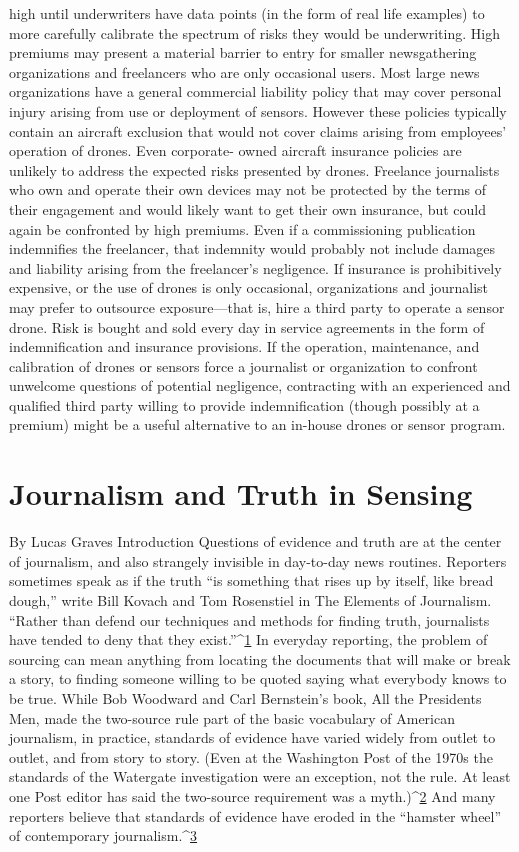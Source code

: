 high until underwriters have data points (in the form of real life examples)
to more carefully calibrate the spectrum of risks they would be underwriting.
High premiums may present a material barrier to entry for smaller
newsgathering organizations and freelancers who are only occasional users.
Most large news organizations have a general commercial liability policy
that may cover personal injury arising from use or deployment of sensors.
However these policies typically contain an aircraft exclusion that would
not cover claims arising from employees' operation of drones. Even corporate-
owned aircraft insurance policies are unlikely to address the expected
risks presented by drones. Freelance journalists who own and operate their
own devices may not be protected by the terms of their engagement and
would likely want to get their own insurance, but could again be confronted
by high premiums. Even if a commissioning publication indemnifies the
freelancer, that indemnity would probably not include damages and liability
arising from the freelancer's negligence.
If insurance is prohibitively expensive, or the use of drones is only occasional,
organizations and journalist may prefer to outsource exposure—that
is, hire a third party to operate a sensor drone. Risk is bought and sold every
day in service agreements in the form of indemnification and insurance
provisions. If the operation, maintenance, and calibration of drones or sensors
force a journalist or organization to confront unwelcome questions of
potential negligence, contracting with an experienced and qualified third
party willing to provide indemnification (though possibly at a premium)
might be a useful alternative to an in-house drones or sensor program.

\section{Journalism and Truth in Sensing}
By Lucas Graves
Introduction
Questions of evidence and truth are at the center of journalism, and also
strangely invisible in day-to-day news routines. Reporters sometimes speak
as if the truth ``is something that rises up by itself, like bread dough,'' write
Bill Kovach and Tom Rosenstiel in The Elements of Journalism. ``Rather than
defend our techniques and methods for finding truth, journalists have
tended to deny that they exist.''^{\href{#endnotes-graves}{1}} In everyday reporting, the problem of
sourcing can mean anything from locating the documents that will make or
break a story, to finding someone willing to be quoted saying what everybody
knows to be true. While Bob Woodward and Carl Bernstein's book,
All the Presidents Men, made the two-source rule part of the basic vocabulary
of American journalism, in practice, standards of evidence have varied
widely from outlet to outlet, and from story to story. (Even at the Washington
Post of the 1970s the standards of the Watergate investigation were an
exception, not the rule. At least one Post editor has said the two-source
requirement was a myth.)^{\href{#endnotes-graves}{2}} And many reporters believe that standards of
evidence have eroded in the ``hamster wheel'' of contemporary journalism.^{\href{#endnotes-graves}{3}}

